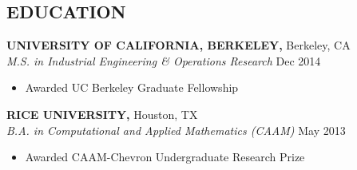 \documentclass[geomargin]{res}
\begin{document}
\begin{resume}
\section{EDUCATION}
{\bf UNIVERSITY OF CALIFORNIA, BERKELEY,} Berkeley, CA \\
{\em M.S. in Industrial Engineering \& Operations Research }
\hfill Dec 2014\\                                     \vspace{-4mm}
\begin{itemize}
  \item Awarded UC Berkeley Graduate Fellowship
\end{itemize}
\vspace{-1mm}

{\bf RICE UNIVERSITY,} Houston, TX \\
{\em B.A. in Computational and Applied Mathematics (CAAM)}
\hfill May 2013\\                                     \vspace{-4mm}
\begin{itemize}                                         \itemsep1pt
  \item Awarded CAAM-Chevron Undergraduate Research Prize
\end{itemize}
\vspace{-1mm}



\end{resume}
\end{document}
